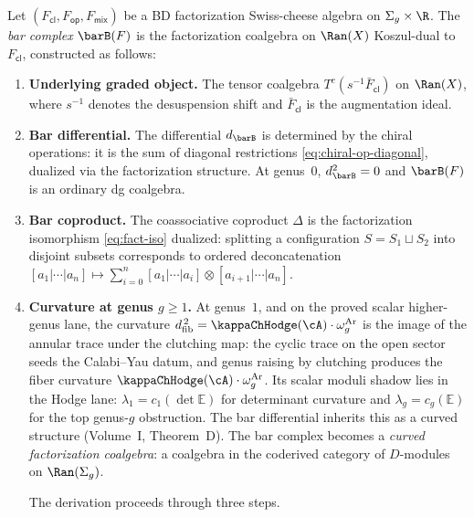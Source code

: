 \begin{construction}
\label{constr:bar-fact-coalgebra}
Let $(F_{\mathsf{cl}}, F_{\mathsf{op}}, F_{\mathsf{mix}})$ be a
BD factorization Swiss-cheese algebra on $\Sigma_g \times \R$.
The \emph{bar complex} $\barB(F)$ is the factorization coalgebra on
$\Ran(X)$ Koszul-dual to $F_{\mathsf{cl}}$, constructed as follows:
\begin{enumerate}[label=\textup{(\roman*)}]
\item \textbf{Underlying graded object.} The tensor coalgebra
 $T^c(s^{-1}\bar{F}_{\mathsf{cl}})$ on $\Ran(X)$, where
 $s^{-1}$ denotes the desuspension shift and
 $\bar{F}_{\mathsf{cl}}$ is the augmentation ideal.

\item \textbf{Bar differential.} The differential
 $d_{\barB}$ is determined by the chiral operations:
 it is the sum of diagonal restrictions
 \eqref{eq:chiral-op-diagonal}, dualized via the
 factorization structure. At genus~$0$,
 $d_{\barB}^2 = 0$ and $\barB(F)$ is an ordinary dg coalgebra.

\item \textbf{Bar coproduct.} The coassociative coproduct
 $\Delta$ is the factorization isomorphism
 \eqref{eq:fact-iso} dualized: splitting a configuration
 $S = S_1 \sqcup S_2$ into disjoint subsets corresponds to
 ordered deconcatenation $[a_1|\cdots|a_n] \mapsto
 \sum_{i=0}^n [a_1|\cdots|a_i] \otimes
 [a_{i+1}|\cdots|a_n]$.

\item \textbf{Curvature at genus $g \geq 1$.} At genus~$1$, and on
 the proved scalar higher-genus lane, the curvature
 $\dfib^{\,2} = \kappaChHodge(\cA) \cdot \omega_g^{\mathrm{Ar}}$ is
 the image of the annular trace under the clutching map:
 the cyclic trace on the open sector seeds the Calabi--Yau
 datum, and genus raising by clutching produces the fiber curvature
 $\kappaChHodge(\cA) \cdot \omega_g^{\mathrm{Ar}}$. Its scalar moduli
 shadow lies in the Hodge lane: $\lambda_1=c_1(\det\mathbb E)$ for
 determinant curvature and $\lambda_g=c_g(\mathbb E)$ for the top
 genus-$g$ obstruction.
 The bar differential inherits this as a curved structure
 (Volume~I, Theorem~D). The bar complex becomes a
 \emph{curved factorization coalgebra}: a coalgebra in the
 coderived category of $D$-modules on $\Ran(\Sigma_g)$.

 The derivation proceeds through three steps.


\end{enumerate}
\end{construction}
